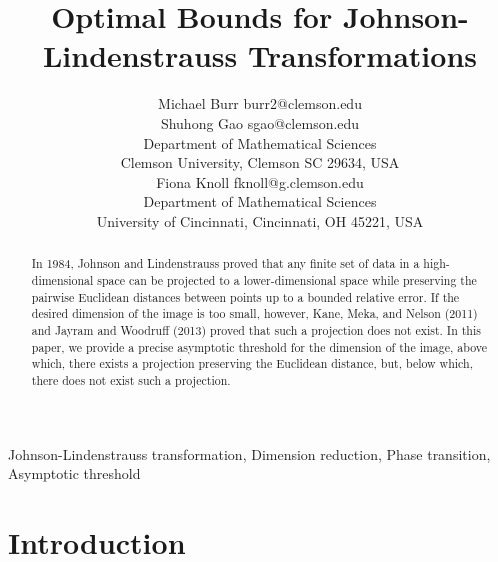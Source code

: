 \documentclass[twoside,11pt]{article}
\begin{document}
\title{Optimal Bounds for Johnson-Lindenstrauss Transformations}

\author{\name Michael Burr  \email burr2@clemson.edu \\
       \name Shuhong Gao  \email sgao@clemson.edu \\
              \addr Department of Mathematical Sciences\\
       Clemson University, Clemson SC 29634, USA \\
       \AND
       \name Fiona Knoll  \email fknoll@g.clemson.edu \\
       \addr Department of Mathematical Sciences\\
       University of Cincinnati, Cincinnati, OH 45221, USA}


\maketitle


\begin{abstract}%
In 1984, Johnson and Lindenstrauss proved that any finite set of data in a high-dimensional space can be projected to a lower-dimensional space while preserving the pairwise Euclidean distances between points up to a bounded relative error.
If the desired dimension of the image is too small, however,  
Kane, Meka, and Nelson (2011) and Jayram and Woodruff (2013) proved that such a projection does not exist.
In this paper, we provide a precise asymptotic threshold for the dimension of the image, above which, there exists a projection preserving the Euclidean distance, but, below which, there does not exist such a projection.
\end{abstract}


\begin{keywords}
Johnson-Lindenstrauss transformation, Dimension reduction, Phase transition, Asymptotic threshold 
\end{keywords}







\section{Introduction}
\end{document}
